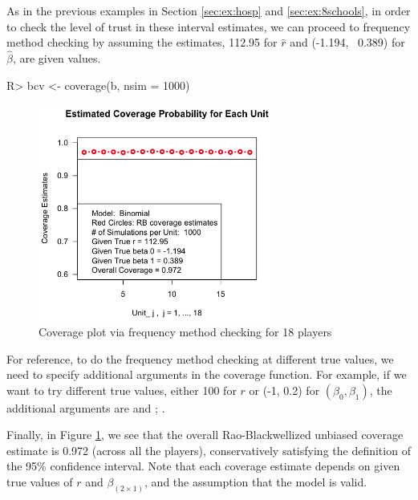 \documentclass[article]{jss}
\begin{document}
As in the previous examples in Section \ref{sec:ex:hosp} and \ref{sec:ex:8schools}, in order to check the level of trust in these interval estimates, we can proceed to frequency method checking by assuming the estimates, 112.95 for $\hat{r}$ and (-1.194, ~0.389) for $\hat{\beta}$, are given values. 

\begin{CodeChunk}
\begin{CodeInput}
R> bcv <- coverage(b, nsim = 1000) 
\end{CodeInput}
\end{CodeChunk}
\begin{figure}[h]
\begin{center}
\includegraphics[width = 3in]{baseball2.png}
\caption{Coverage plot via frequency method checking for 18 players}
\label{fig:baseball2}
\end{center}
\end{figure}

For reference, to do the frequency method checking at different true values, we need to specify additional arguments in the coverage function. For example, if we want to try different true values, either 100 for $r$ or (-1, 0.2) for $(\beta_{0}, \beta_{1})$, the additional arguments are  and ; .


Finally, in Figure \ref{fig:baseball2}, we see that the overall Rao-Blackwellized unbiased coverage estimate is 0.972 (across all the players), conservatively satisfying the definition of the 95\% confidence interval. Note that each coverage estimate depends on given true values of $r$ and $\beta_{(2\times1)}$, and the assumption that the model is valid.
\end{document}
